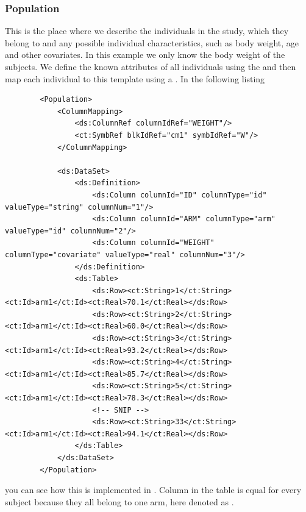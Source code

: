 \subsubsection{Population}

This is the place where we describe the individuals in the study, which 
 they belong to and any possible individual characteristics, such as 
body weight, age and other covariates. In this example we only know the
body weight of the subjects. 
We define the known attributes of all individuals using the 
 and then map each individual to this template 
using a . In the following listing 
\lstset{language=XML}
\begin{lstlisting}
        <Population>
            <ColumnMapping>
                <ds:ColumnRef columnIdRef="WEIGHT"/>
                <ct:SymbRef blkIdRef="cm1" symbIdRef="W"/>
            </ColumnMapping>
            
            <ds:DataSet>
                <ds:Definition>
                    <ds:Column columnId="ID" columnType="id" valueType="string" columnNum="1"/>
                    <ds:Column columnId="ARM" columnType="arm" valueType="id" columnNum="2"/>
                    <ds:Column columnId="WEIGHT" columnType="covariate" valueType="real" columnNum="3"/>
                </ds:Definition>
                <ds:Table>
                    <ds:Row><ct:String>1</ct:String><ct:Id>arm1</ct:Id><ct:Real>70.1</ct:Real></ds:Row>
                    <ds:Row><ct:String>2</ct:String><ct:Id>arm1</ct:Id><ct:Real>60.0</ct:Real></ds:Row>
                    <ds:Row><ct:String>3</ct:String><ct:Id>arm1</ct:Id><ct:Real>93.2</ct:Real></ds:Row>
                    <ds:Row><ct:String>4</ct:String><ct:Id>arm1</ct:Id><ct:Real>85.7</ct:Real></ds:Row>
                    <ds:Row><ct:String>5</ct:String><ct:Id>arm1</ct:Id><ct:Real>78.3</ct:Real></ds:Row>
                    <!-- SNIP -->
                    <ds:Row><ct:String>33</ct:String><ct:Id>arm1</ct:Id><ct:Real>94.1</ct:Real></ds:Row>
                </ds:Table>
            </ds:DataSet>
        </Population>
\end{lstlisting}

you can see how this 
is implemented in \pharmml. Column  in the table is equal for
every subject because they all belong to one arm, here denoted as .




